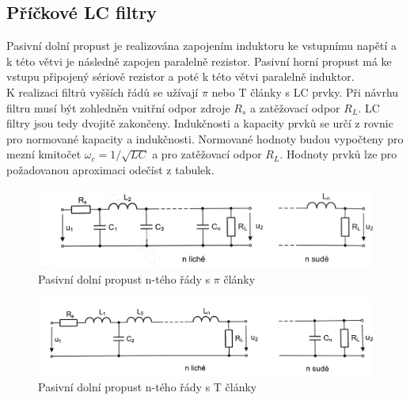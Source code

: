 \subsection{Příčkové LC filtry}\label{s:LC}
Pasivní dolní propust je realizována zapojením induktoru ke vstupnímu napětí a k této větvi je následně zapojen paralelně rezistor. Pasivní horní propust má ke vstupu připojený sériově rezistor a poté k této větvi paralelně induktor. \\
K realizaci filtrů vyšších řádů se užívají $\pi$ nebo T články s LC prvky. Při návrhu filtru musí být zohledněn vnitřní odpor zdroje $R_s$ a zatěžovací odpor $R_L$. LC filtry jsou tedy dvojitě zakončeny. Indukčnosti a kapacity prvků se určí z rovnic pro normované kapacity a indukčnosti. Normované hodnoty budou vypočteny pro mezní kmitočet $\omega _c = 1/\sqrt{LC}$ a pro zatěžovací odpor $R_L$. Hodnoty prvků lze pro požadovanou aproximaci odečíst z tabulek. \\
\begin{figure}[h]
\centering
\includegraphics[scale=0.1]{piclanky.png}
\caption[Pasivní dolní propust n-tého řády s $\pi$ články]{Pasivní dolní propust n-tého řády s $\pi$ články \cite{14}}
\end{figure}
\begin{figure}[h]
\centering
\includegraphics[scale=0.08]{tclanky.png}
\caption[Pasivní dolní propust n-tého řády s T články]{Pasivní dolní propust n-tého řády s T články \cite{14}}
\end{figure}
\newpage
